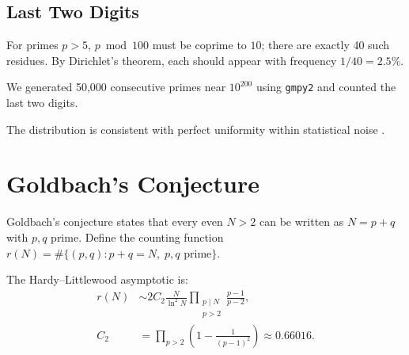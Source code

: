 \documentclass{sbc2023-pdf}%
\theoremstyle{plain}
\begin{document}
\subsection{Last Two Digits}
\label{sec:last2}

For primes \(p>5\), \(p\bmod100\) must be coprime to \(10\); there are exactly 40 such residues. By Dirichlet's theorem, each should appear with frequency \(1/40=2.5\%\).

We generated 50,000 consecutive primes near \(10^{200}\) using {\tt gmpy2} and counted the last two digits.

\begin{table}[htbp]
\centering
\caption{Last-two-digit distribution for 50,000 primes near \(10^{200}\).}
\label{tab:last2}
\end{table}

The distribution is consistent with perfect uniformity within statistical noise \citep{shoup2009}.

\section{Goldbach's Conjecture}
\label{sec:goldbach}

Goldbach's conjecture states that every even \(N>2\) can be written as \(N=p+q\) with \(p,q\) prime. Define the counting function \(r(N)=\#\{(p,q): p+q=N,\; p,q\text{ prime}\}\).

The Hardy--Littlewood asymptotic \citep{hardy1923} is:
\[
\begin{aligned}
r(N) &\sim 2C_2 \frac{N}{\ln^2 N} \prod_{\substack{p\mid N\\ p>2}} \frac{p-1}{p-2},\\[2pt]
C_2 &= \prod_{p>2}\left(1-\frac1{(p-1)^2}\right)\approx0.66016.
\end{aligned}
\]
\end{document}
